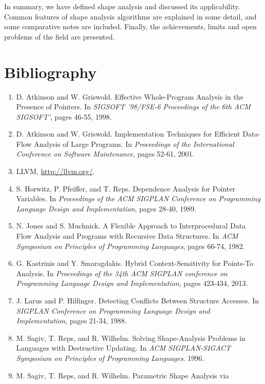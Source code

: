 \documentclass{article}
\begin{document}
In summary, we have defined shape analysis and discussed its applicability.
Common features of shape analysis algorithms are explained in some detail,
and some comparative notes are included. Finally, the achievements, limits
and open problems of the field are presented.

\section{Bibliography}

\begin{enumerate}[1.]
    \item D. Atkinson and W. Griswold. Effective Whole-Program Analysis in
        the Presence of Pointers. In \textit{SIGSOFT '98/FSE-6 Proceedings
        of the 6th ACM SIGSOFT'}, pages 46-55, 1998.
    \item D. Atkinson and W. Griswold. Implementation Techniques for
        Efficient Data-Flow Analysis of Large Programs. In
        \textit{Proceedings of the International Conference on Software
        Maintenance}, pages 52-61, 2001.
    \item LLVM, \url{http://llvm.org/}.
    \item S. Horwitz, P. Pfeiffer, and T. Reps. Dependence Analysis for
        Pointer Variables. In \textit{Proceedings of the ACM SIGPLAN 
        Conference on Programming Language Design and Implementation}, pages
        28-40, 1989.
    \item N. Jones and S. Muchnick. A Flexible Approach to Interprocedural
        Data Flow Analysis and Programs with Recursive Data Structures. In
        \textit{ACM Symposium on Principles of Programming Languages}, pages
        66-74, 1982.
    \item G. Kastrinis and Y. Smaragdakis. Hybrid Context-Sensitivity for
        Points-To Analysis. In \textit{Proceedings of the 34th ACM SIGPLAN
        conference on Programming Language Design and Implementation}, pages
        423-434, 2013.
    \item J. Larus and P. Hilfinger. Detecting Conflicts Between Structure
        Accesses. In \textit{SIGPLAN Conference on Programming Language
        Design and Implementation}, pages 21-34, 1988.
    \item M. Sagiv, T. Reps, and R. Wilhelm. Solving Shape-Analysis Problems
        in Languages with Destructive Updating. In \textit{ACM
        SIGPLAN-SIGACT Symposium on Principles of Programming Languages}.
        1996.
    \item M. Sagiv, T. Reps, and R. Wilhelm. Parametric Shape Analysis via

\end{enumerate}
\end{document}
